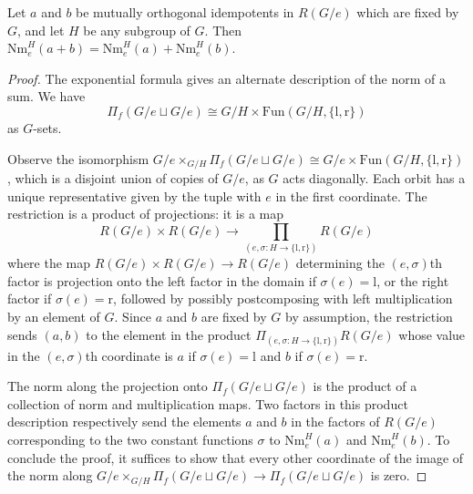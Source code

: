 \documentclass[10pt,a4paper]{amsart}
\begin{document}
\begin{lemma}\label{lem:norm-of-idempotents-is-additive}
	Let $a$ and $b$ be mutually orthogonal idempotents in $R(G/e)$ which are fixed by $G$, and let $H$ be any subgroup of $G$. Then $\mathrm{Nm}_e^H(a+b) = \mathrm{Nm}_e^H(a)+\mathrm{Nm}_e^H(b)$.
\end{lemma}

\begin{proof}
	The exponential formula gives an alternate description of the norm of a sum. We have 
    \[ 
        \Pi_f (G/e \sqcup G/e) \cong G/H \times \mathrm{Fun}(G/H,\{ \mathrm{l} , \mathrm{r} \}) 
    \] 
    as $G$-sets.
	
	Observe the isomorphism $G/e \times_{G/H} \Pi_f (G/e \sqcup G/e) \cong G/e \times \mathrm{Fun}(G/H,\{ \mathrm{l} , \mathrm{r} \})$, which is a disjoint union of copies of $G/e$, as $G$ acts diagonally. Each orbit has a unique representative given by the tuple with $e$ in the first coordinate. The restriction is a product of projections: it is a map \[ R(G/e) \times R(G/e) \rightarrow \prod_{(e,\sigma : H \rightarrow \{ \mathrm{l} , \mathrm{r} \})} R(G/e) \] where the map $R(G/e) \times R(G/e) \rightarrow R(G/e)$ determining the $(e,\sigma)$th factor is projection onto the left factor in the domain if $\sigma(e) = \mathrm{l}$, or the right factor if $\sigma(e) = \mathrm{r}$, followed by possibly postcomposing with left multiplication by an element of $G$. Since $a$ and $b$ are fixed by $G$ by assumption, the restriction sends $(a,b)$ to the element in the product $\Pi_{(e,\sigma : H \rightarrow \{ \mathrm{l} , \mathrm{r} \})} R(G/e)$ whose value in the $(e,\sigma)$th coordinate is $a$ if $\sigma(e) = \mathrm{l}$ and $b$ if $\sigma(e) = \mathrm{r}$.
	
	The norm along the projection onto $\Pi_f (G/e \sqcup G/e)$ is the product of a collection of norm and multiplication maps. Two factors in this product description respectively send the elements $a$ and $b$ in the factors of $R(G/e)$ corresponding to the two constant functions $\sigma$ to $\mathrm{Nm}_e^H(a)$ and $\mathrm{Nm}_e^H(b)$. To conclude the proof, it suffices to show that every other coordinate of the image of the norm along $G/e \times_{G/H} \Pi_f ( G/e \sqcup G/e) \rightarrow \Pi_f (G/e \sqcup G/e)$ is zero.
	

\end{proof}
\end{document}
